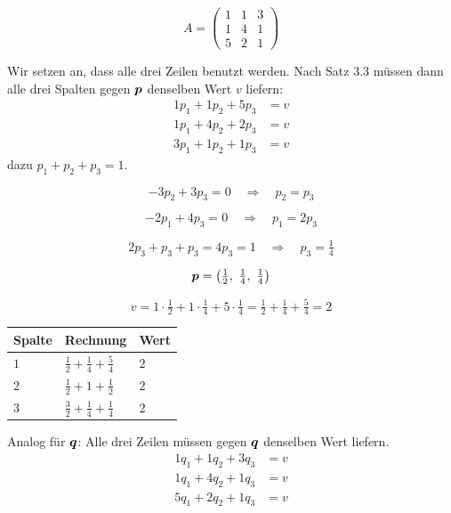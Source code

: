 \begin{merksatz}
\[ A = \begin{pmatrix} 1 & 1 & 3\\ 1 & 4 & 1\\ 5 & 2 & 1 \end{pmatrix} \]

Wir setzen an, dass alle drei Zeilen benutzt werden. Nach Satz 3.3 müssen dann alle drei Spalten gegen $\boldsymbol{p}$ denselben Wert $v$ liefern:
\begin{align*}
1p_1 + 1p_2 + 5p_3 &= v\\
1p_1 + 4p_2 + 2p_3 &= v\\
3p_1 + 1p_2 + 1p_3 &= v
\end{align*}
dazu $p_1+p_2+p_3 = 1$.

\[ -3p_2 + 3p_3 = 0 \quad\Longrightarrow\quad p_2 = p_3 \]

\[ -2p_1 + 4p_3 = 0 \quad\Longrightarrow\quad p_1 = 2p_3 \]

\[ 2p_3 + p_3 + p_3 = 4p_3 = 1 \quad\Longrightarrow\quad p_3 = \tfrac14 \]

\[ \vek p = \left(\tfrac12,\ \tfrac14,\ \tfrac14\right) \]

\[ v = 1\cdot\tfrac12 + 1\cdot\tfrac14 + 5\cdot\tfrac14 = \tfrac12+\tfrac14+\tfrac54 = 2 \]

\begin{center}
\renewcommand{\arraystretch}{1.48}
\begin{tabular}{@{}P{2.0cm}P{4.0cm}P{1.6cm}@{}}
\toprule
\textbf{Spalte} & \textbf{Rechnung} & \textbf{Wert}\\
\midrule
$1$ & $\tfrac12+\tfrac14+\tfrac54$ & $2$\\
$2$ & $\tfrac12+1+\tfrac12$ & $2$\\
$3$ & $\tfrac32+\tfrac14+\tfrac14$ & $2$\\
\bottomrule
\end{tabular}
\end{center}
\checkmark

Analog für $\boldsymbol{q}$: Alle drei Zeilen müssen gegen $\boldsymbol{q}$ denselben Wert liefern.
\begin{align*}
1q_1 + 1q_2 + 3q_3 &= v\\
1q_1 + 4q_2 + 1q_3 &= v\\
5q_1 + 2q_2 + 1q_3 &= v
\end{align*}


\end{merksatz}
